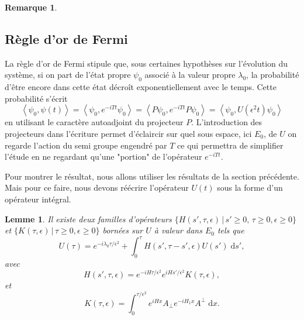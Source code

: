 \documentclass[12pt,openany,a4paper, titlepage]{article}
\newcommand{\la}{\left\langle}
\newcommand{\ra}{\right\rangle}
\newcommand{\dd}{\;\mathrm{d}}
\newcommand{\St}[2]{e^{-i #1 #2}}
\newcommand{\Stt}[2]{e^{i #1 #2}}
\newtheorem{lem}{Lemme}
\theoremstyle{definition}
\theoremstyle{definition}
\theoremstyle{definition}
\theoremstyle{definition}
\theoremstyle{definition}
\newtheorem{rem}{Remarque}
\theoremstyle{definition}
\begin{document}
\begin{rem}
\subsection{Règle d'or de Fermi}

La règle d'or de Fermi stipule que, sous certaines hypothèses sur l'évolution du système, si on part de l'état propre $\psi_0$ associé à la valeur propre $\lambda_0$, la probabilité d'être encore dans cette état décroît exponentiellement avec le temps. Cette probabilité s'écrit 
$$\la \psi_0,\psi(t) \ra = \la \psi_0, \St{T}{t} \psi_0 \ra = \la P\psi_0, \St{T}{t} P\psi_0 \ra = \la \psi_0, U(\epsilon^2t) \psi_0 \ra$$
en utilisant le caractère autoadjoint du projecteur $P$. L'introduction des projecteurs dans l'écriture permet d'éclaircir sur quel sous espace, ici $E_0$, de $U$ on regarde l'action du semi groupe engendré par $T$ ce qui permettra de simplifier l'étude en ne regardant qu'une "portion" de l'opérateur $\St{T}{t}$.


Pour montrer le résultat, nous allons utiliser les résultats de la section précédente. Mais pour ce faire, nous devons réécrire l'opérateur $U(t)$ sous la forme d'un opérateur intégral.

\begin{lem}
Il existe deux familles d'opérateurs $\{H(s',\tau, \epsilon) \, |\, s'\geq 0, \, \tau \geq 0, \epsilon \geq 0\}$ et $\{K(\tau, \epsilon) \, | \, \tau \geq 0, \epsilon \geq 0\}$ bornées sur $U$ à valeur dans $E_0$ tels que 
\begin{equation}
    U(\tau) = \St{\lambda_0}{\tau/\epsilon^2} + \int_0^{\tau} H(s',\tau - s', \epsilon) U(s') \dd s',
\end{equation}
avec
\begin{equation}
    H(s',\tau, \epsilon) = \St{H}{\tau/\epsilon^2}\Stt{H}{s'/\epsilon^2} K(\tau,\epsilon),
\end{equation}
et
\begin{equation}
    K(\tau, \epsilon) = \int_0^{\tau/\epsilon^2} \Stt{H}{x}A_\perp \St{H_1}{x}A^\perp \dd x.
\end{equation}
\end{lem}


\end{rem}
\end{document}
